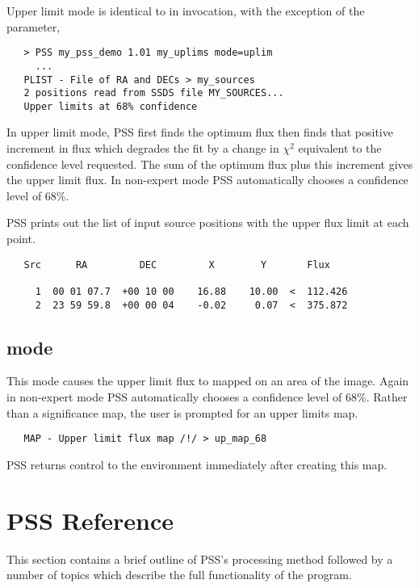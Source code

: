 Upper limit mode is identical to  in invocation, with the
exception of the  parameter,
\begin{verbatim}
   > PSS my_pss_demo 1.01 my_uplims mode=uplim
     ...
   PLIST - File of RA and DECs > my_sources
   2 positions read from SSDS file MY_SOURCES...
   Upper limits at 68% confidence
\end{verbatim}
In upper limit mode, PSS first finds the optimum flux then finds that positive
increment in flux which degrades the fit by a change in $\chi^2$ equivalent
to the confidence level requested. The sum of the optimum flux plus this
increment gives the upper limit flux.
In non-expert mode PSS automatically chooses a confidence level of 68\%. 

PSS prints out the list of input source positions with the upper flux limit
at each point.
\begin{verbatim}
   Src      RA         DEC         X        Y       Flux

     1  00 01 07.7  +00 10 00    16.88    10.00  <  112.426
     2  23 59 59.8  +00 00 04    -0.02     0.07  <  375.872
\end{verbatim}

\subsection{ mode}
\label{pss:tut:upmap}
This mode causes the upper limit flux to mapped on an area of the image. 
Again in non-expert mode PSS automatically chooses a confidence level of 68\%.
Rather than a significance map, the user is prompted for an upper limits map.
\begin{verbatim}
   MAP - Upper limit flux map /!/ > up_map_68
\end{verbatim}
PSS returns control to the environment immediately after creating this map.

\newpage
\section{PSS Reference}
\label{pss:ref}
This section contains a brief outline of PSS's processing method followed
by a number of topics which describe the full functionality of the program.

